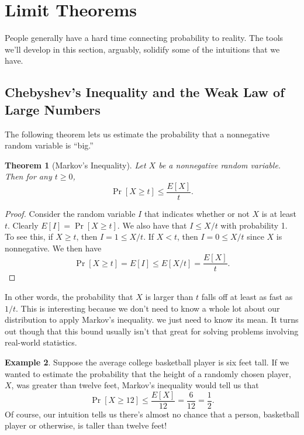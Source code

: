 \documentclass[12pt]{article}
\theoremstyle{plain}
\newtheorem{theorem}{Theorem}[section]
\theoremstyle{definition}
\newtheorem{example}[theorem]{Example}
\theoremstyle{remark}
\begin{document}
\section{Limit Theorems}

People generally have a hard time connecting probability to reality.
The tools we'll develop in this section, arguably, solidify some of the intuitions that we have.

\subsection{Chebyshev's Inequality and the Weak Law of Large Numbers}

The following theorem lets us estimate the probability that a nonnegative random variable is ``big.''

\begin{theorem}[Markov's Inequality]
    Let $X$ be a nonnegative random variable.
    Then for any $t \geq 0$,
    \[
        \Pr[X \geq t] \leq \frac{E[X]}{t}.
    \]
\end{theorem}
\begin{proof}
    Consider the random variable $I$ that indicates whether or not $X$ is at least $t$.
    Clearly $E[I] = \Pr[X \geq t]$.
    We also have that $I \leq X/t$ with probability 1.
    To see this, if $X \geq t$, then $I = 1 \leq X/t$.
    If $X < t$, then $I = 0 \leq X/t$ since $X$ is nonnegative.
    We then have
    \[
        \Pr[X \geq t] = E[I] \leq E[X/t] = \frac{E[X]}{t}.
    \]
\end{proof}

In other words, the probability that $X$ is larger than $t$ falls off at least as fast as $1/t$.
This is interesting because we don't need to know a whole lot about our distribution to apply Markov's inequality.
we just need to know its mean.
It turns out though that this bound usually isn't that great for solving problems involving real-world statistics.

\begin{example}
    Suppose the average college basketball player is six feet tall.
    If we wanted to estimate the probability that the height of a randomly chosen player, $X$, was greater than twelve feet, Markov's inequality would tell us that
    \[
        \Pr[X \geq 12] \leq \frac{E[X]}{12} = \frac{6}{12} = \frac{1}{2}.
    \]
    Of course, our intuition tells us there's almost no chance that a person, basketball player or otherwise, is taller than twelve feet!
\end{example}
\end{document}
